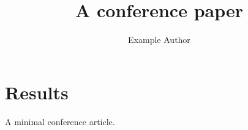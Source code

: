 \documentclass[sigconf]{acmart}
\begin{document}
\title{A conference paper}\author{Example Author}\maketitle
\section{Results}A minimal conference article.
\end{document}
